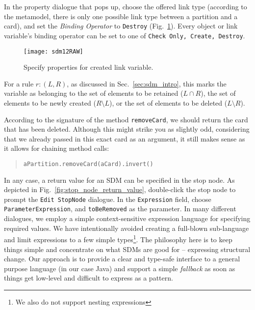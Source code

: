 In the property dialogue that pops up, choose the offered link type (according to the metamodel, there is only one possible link type between a partition and a
 card), and set the \emph{Binding Operator} to \texttt{Destroy} (Fig.~\ref{fig:link_variable_properties}). Every object or link
variable's binding operator can be set to one of \texttt{Check Only, Create, Destroy}.

\begin{figure}[htp]
\begin{center} 
 \texttt{[image: sdm12RAW]}
  \caption{Specify properties for created link variable.}  
  \label{fig:link_variable_properties}
\end{center}
\end{figure}


For a rule $r: (L, R)$, as discussed in Sec.~\ref{sec:sdm_intro}, this marks the variable as belonging to the set of elements to be retained ($L\cap R$), the
set of elements to be newly created ($R\setminus L$), or the set of elements to be deleted ($L\setminus R$).
 
According to the signature of the method \texttt{removeCard}, we should return the card that has been deleted. Although this might strike you as slightly odd,
considering that we already passed in this exact card as an argument, it still makes sense as it allows for chaining method calls:
\begin{quote}\texttt{aPartition.removeCard(aCard).invert()}\end{quote} In any case, a return value for an SDM can be specified in the stop node.  As depicted in Fig.~\ref{fig:stop_node_return_value}, double-click the stop node to prompt the \texttt{Edit StopNode} dialogue.  In
the \texttt{Expression} field, choose \texttt{ParameterExpression}, and \texttt{toBeRemoved} as the parameter. In many different dialogues, we employ a simple
context-sensitive expression language for specifying required values. We have intentionally avoided creating a full-blown sub-language and limit expressions to
a few simple types\footnote{We also do not support nesting expressions}.
The philosophy here is to keep things simple and concentrate on what SDMs are good for -- expressing structural change.
Our approach is to provide a clear and type-safe interface to a general purpose language (in our case Java) and support a simple \emph{fallback} as soon as
things get low-level and difficult to express as a pattern.

